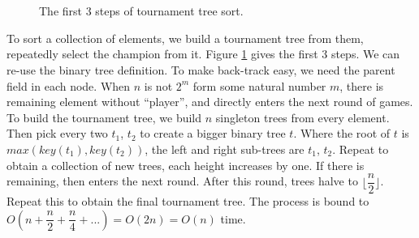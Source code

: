\documentclass[b5paper]{article}
\begin{document}
\captionsetup[subfigure]{labelformat=empty, margin=10pt}
\begin{figure}[htbp]
  \centering
   \\
   \\
  \caption{The first 3 steps of tournament tree sort.}
  \label{fig:tournament-tree-4}
\end{figure}
\captionsetup[subfigure]{labelformat=parens}

To sort a collection of elements, we build a tournament tree from them, repeatedly select the champion from it. Figure \ref{fig:tournament-tree-4} gives the first 3 steps. We can re-use the binary tree definition. To make back-track easy, we need the parent field in each node. When $n$ is not $2^m$ form some natural number $m$, there is remaining element without ``player'', and directly enters the next round of games. To build the tournament tree, we build $n$ singleton trees from every element. Then pick every two $t_1$, $t_2$ to create a bigger binary tree $t$. Where the root of $t$ is $max(key(t_1), key(t_2))$, the left and right sub-trees are $t_1$, $t_2$. Repeat to obtain a collection of new trees, each height increases by one. If there is remaining, then enters the next round. After this round, trees halve to $\lfloor \dfrac{n}{2} \rfloor$. Repeat this to obtain the final tournament tree. The process is bound to $O(n + \dfrac{n}{2} + \dfrac{n}{4} + ... ) = O(2n) = O(n)$ time.
\end{document}
